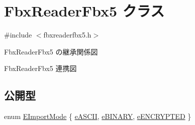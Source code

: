 \hypertarget{class_fbx_reader_fbx5}{}\section{Fbx\+Reader\+Fbx5 クラス}
\label{class_fbx_reader_fbx5}


{\ttfamily \#include $<$fbxreaderfbx5.\+h$>$}



Fbx\+Reader\+Fbx5 の継承関係図


Fbx\+Reader\+Fbx5 連携図
\subsection*{公開型}
\begin{DoxyCompactItemize}
\item 
enum \hyperlink{class_fbx_reader_fbx5_a9d205ec64b33007dd74af093943b50c5}{E\+Import\+Mode} \{ \hyperlink{class_fbx_reader_fbx5_a9d205ec64b33007dd74af093943b50c5ad5ec6aa189d4f8dd1c0f74907b72d800}{e\+A\+S\+C\+II}, 
\hyperlink{class_fbx_reader_fbx5_a9d205ec64b33007dd74af093943b50c5ae11f33f94eb2bd6ea602deab3bc7cb6f}{e\+B\+I\+N\+A\+RY}, 
\hyperlink{class_fbx_reader_fbx5_a9d205ec64b33007dd74af093943b50c5a1a218e22b2c3355b99c5b68f73959c26}{e\+E\+N\+C\+R\+Y\+P\+T\+ED}
 \}
\end{DoxyCompactItemize}
